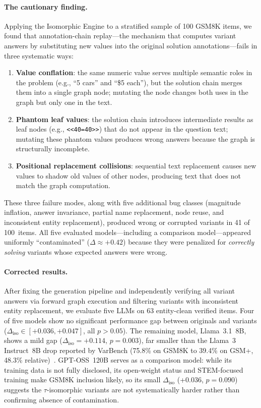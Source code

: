 \paragraph{The cautionary finding.}
Applying the Isomorphic Engine to a stratified sample of 100 GSM8K
items, we found that annotation-chain replay---the mechanism that
computes variant answers by substituting new values into the
original solution annotations---fails in three systematic ways:
\begin{enumerate}[leftmargin=*, nosep]
\item \textbf{Value conflation}: the same numeric value serves
multiple semantic roles in the problem (e.g., ``5 cars'' and
``\$5 each''), but the solution chain merges them into a single
graph node; mutating the node changes both uses in the graph but only
one in the text.
\item \textbf{Phantom leaf values}: the solution chain introduces
intermediate results as leaf nodes (e.g., \texttt{<<40=40>>}) that
do not appear in the question text; mutating these phantom values
produces wrong answers because the graph is structurally incomplete.
\item \textbf{Positional replacement collisions}: sequential text
replacement causes new values to shadow old values of other nodes,
producing text that does not match the graph computation.
\end{enumerate}
These three failure modes, along with five additional bug classes
(magnitude inflation, answer invariance, partial name replacement,
node reuse, and inconsistent entity replacement), produced wrong or
corrupted variants in 41 of 100~items.
All five evaluated models---including a comparison model---appeared
uniformly ``contaminated'' ($\Delta \approx +0.42$) because they were
penalized for \emph{correctly solving} variants whose expected answers
were wrong.

\paragraph{Corrected results.}
After fixing the generation pipeline and independently verifying all
variant answers via forward graph execution and filtering variants
with inconsistent entity replacement, we evaluate five LLMs on
63 entity-clean verified items. Four of five models show no significant performance gap
between originals and variants
($\Delta_{\mathrm{iso}} \in [+0.036, +0.047]$, all $p > 0.05$).
The remaining model, Llama~3.1~8B, shows a mild gap
($\Delta_{\mathrm{iso}} = +0.114$, $p = 0.003$), far smaller than
the Llama~3 Instruct~8B drop reported by VarBench (75.8\% on GSM8K
to 39.4\% on GSM+, 48.3\% relative)~\cite{qian2024varbench}.
GPT-OSS~120B serves as a comparison model: while its training data is
not fully disclosed, its open-weight status and STEM-focused training
make GSM8K inclusion likely, so its small $\Delta_{\mathrm{iso}}$
(+0.036, $p = 0.090$) suggests the $\tau$-isomorphic variants are not
systematically harder rather than confirming absence of contamination.

